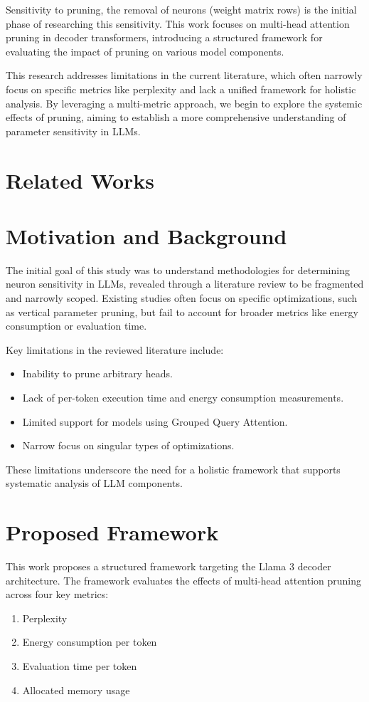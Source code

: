 \documentclass[conference]{IEEEtran}
\begin{document}
    Sensitivity to pruning, the removal of neurons (weight matrix rows) is the initial phase of researching this sensitivity.
    This work focuses on multi-head attention pruning in decoder transformers, introducing a structured framework for evaluating the impact of pruning on various model components.

    This research addresses limitations in the current literature, which often narrowly focus on specific metrics like perplexity and lack a unified framework for holistic analysis.
    By leveraging a multi-metric approach, we begin to explore the systemic effects of pruning, aiming to establish a more comprehensive understanding of parameter sensitivity in LLMs.

    \section{Related Works}

    \section{Motivation and Background}
    The initial goal of this study was to understand methodologies for determining neuron sensitivity in LLMs, revealed through a literature review to be fragmented and narrowly scoped.
    Existing studies often focus on specific optimizations, such as vertical parameter pruning, but fail to account for broader metrics like energy consumption or evaluation time.

    Key limitations in the reviewed literature include:
    \begin{itemize}
        \item Inability to prune arbitrary heads.
        \item Lack of per-token execution time and energy consumption measurements.
        \item Limited support for models using Grouped Query Attention.
        \item Narrow focus on singular types of optimizations.
    \end{itemize}
    These limitations underscore the need for a holistic framework that supports systematic analysis of LLM components.

    \section{Proposed Framework}
    This work proposes a structured framework targeting the Llama 3 decoder architecture. The framework evaluates the effects of multi-head attention pruning across four key metrics:
    \begin{enumerate}
        \item Perplexity
        \item Energy consumption per token
        \item Evaluation time per token
        \item Allocated memory usage
    \end{enumerate}
\end{document}
